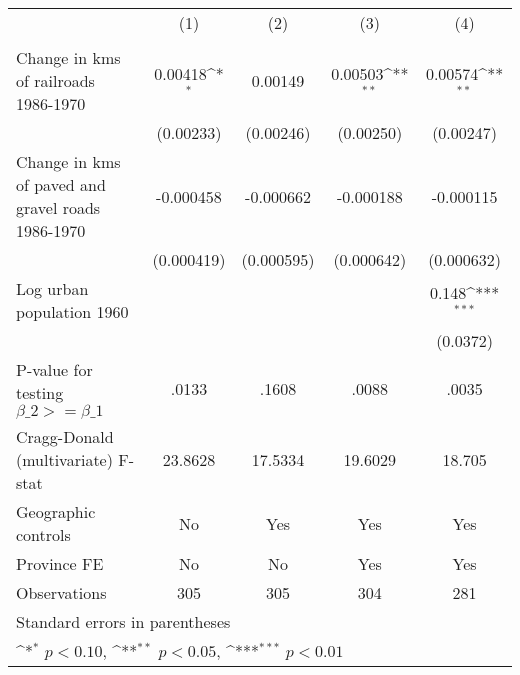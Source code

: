 {
\def\sym#1{\ifmmode^{#1}\else\(^{#1}\)\fi}
\begin{tabular}{l*{4}{c}}
\hline\hline
                &\multicolumn{1}{c}{(1)}&\multicolumn{1}{c}{(2)}&\multicolumn{1}{c}{(3)}&\multicolumn{1}{c}{(4)}\\
                &\multicolumn{1}{c}{}&\multicolumn{1}{c}{}&\multicolumn{1}{c}{}&\multicolumn{1}{c}{}\\
\hline
Change in kms of railroads 1986-1970&  0.00418\sym{*}  &  0.00149         &  0.00503\sym{**} &  0.00574\sym{**} \\
                &(0.00233)         &(0.00246)         &(0.00250)         &(0.00247)         \\
[1em]
Change in kms of paved and gravel roads 1986-1970&-0.000458         &-0.000662         &-0.000188         &-0.000115         \\
                &(0.000419)         &(0.000595)         &(0.000642)         &(0.000632)         \\
[1em]
Log urban population 1960&                  &                  &                  &    0.148\sym{***}\\
                &                  &                  &                  & (0.0372)         \\
\hline
P-value for testing $\beta\_{2} >= \beta\_{1}$&    .0133         &    .1608         &    .0088         &    .0035         \\
Cragg-Donald (multivariate) F-stat&  23.8628         &  17.5334         &  19.6029         &   18.705         \\
Geographic controls&       No         &      Yes         &      Yes         &      Yes         \\
Province FE     &       No         &       No         &      Yes         &      Yes         \\
Observations    &      305         &      305         &      304         &      281         \\
\hline\hline
\multicolumn{5}{l}{\footnotesize Standard errors in parentheses}\\
\multicolumn{5}{l}{\footnotesize \sym{*} \(p<0.10\), \sym{**} \(p<0.05\), \sym{***} \(p<0.01\)}\\
\end{tabular}
}
